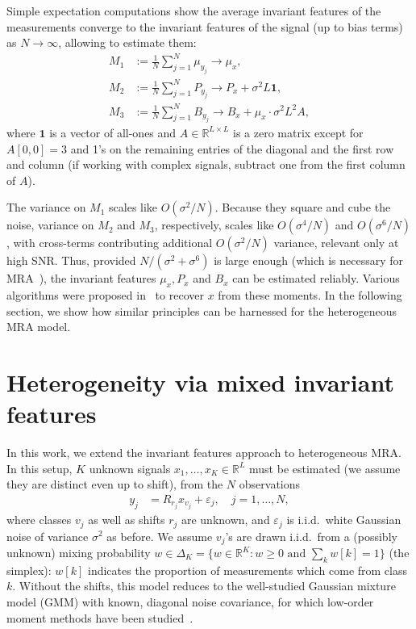 \documentclass[english]{article}
\numberwithin{equation}{section}
\numberwithin{figure}{section}
\theoremstyle{plain}
\theoremstyle{definition}
\theoremstyle{remark}
\theoremstyle{plain}
\theoremstyle{remark}
\theoremstyle{plain}
\theoremstyle{plain}
\newcommand{\reals}{\mathbb{R}}
\newcommand{\RL}{\mathbb{R}^L}
\begin{document}
Simple expectation computations show the average invariant features of the measurements converge to the invariant features of the signal (up to bias terms) as $N \to \infty$, allowing to estimate them:
\begin{align}
	M_1 & := \frac{1}{N} \sum_{j = 1}^N \mu_{y_j} \to \mu_x, \label{eq:M1} \\
	M_2 & := \frac{1}{N} \sum_{j = 1}^N P_{y_j} \to P_x + \sigma^2 L \mathbf{1}, %
	 \label{eq:M2} \\
	M_3 & := \frac{1}{N} \sum_{j = 1}^N B_{y_j} \to B_x + \mu_x \cdot \sigma^2 L^2 A, \label{eq:M3}
\end{align}
where $\mathbf{1}$ is a vector of all-ones and $A \in \reals^{L\times L}$ is a zero matrix except for $A[0, 0] = 3$ and 1's on the remaining entries of the diagonal and the first row and column (if working with complex signals, subtract one from the first column of $A$).

The variance on $M_1$ scales like $O(\sigma^2/N)$. Because they square and cube the noise, variance on $M_2$ and $M_3$, respectively, scales like $O(\sigma^4/N)$ and $O(\sigma^6/N)$, {with cross-terms contributing additional $O(\sigma^2/N)$ variance, relevant only at high SNR}. Thus, provided $N/(\sigma^2+\sigma^6)$ is large enough (which is necessary for MRA~\cite{bandeira2017optimal}), the invariant features $\mu_x, P_x$ and $B_x$ can be estimated reliably. 
Various algorithms were proposed in~\cite{bendory2017bispectrum}  to recover $x$  from these moments. In the following section, we show how similar principles can be harnessed for the heterogeneous MRA model.






\section{Heterogeneity via mixed invariant features} \label{sec:mra_het}

In this work, we extend the invariant features approach to heterogeneous MRA. In this setup, $K$ unknown signals $x_1, \ldots, x_K \in \RL$ must be estimated (we assume they are distinct even up to shift), from the $N$ observations
\begin{align}
	y_j & = R_{r_j}x_{v_j} + \varepsilon_j, \quad j = 1, \dots, N, 
	\label{eq:mra_het}
\end{align}
where classes $v_j$ as well as shifts $r_j$ are unknown, and $\varepsilon_j$ is i.i.d.\ white Gaussian noise of variance $\sigma^2$ as before. We assume $v_j$'s are drawn i.i.d.\ 
from a (possibly unknown) mixing probability $w \in \Delta_K = \{ w\in\reals^K : w\geq 0 \textrm{ and } \sum_k w[k] = 1 \}$ (the simplex): $w[k]$ indicates the proportion of measurements which come from class $k$. 
Without the shifts, this model reduces to the well-studied Gaussian mixture model (GMM) with known, diagonal noise covariance, for which low-order moment methods have been studied~\cite{hsu2013learning,anandkumar2014tensor}.
\end{document}

